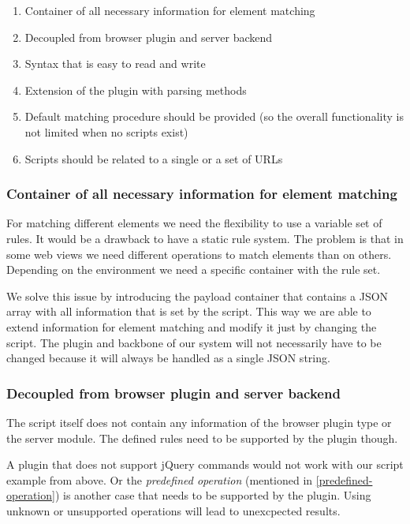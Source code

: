 \begin{enumerate}
	\item Container of all necessary information for element matching
	\item Decoupled from browser plugin and server backend
	\item Syntax that is easy to read and write
	\item Extension of the plugin with parsing methods
	\item Default matching procedure should be provided (so the overall functionality is not limited when no scripts exist)
	\item Scripts should be related to a single or a set of URLs
\end{enumerate}

\subsubsection{Container of all necessary information for element matching}

For matching different elements we need the flexibility to use a variable set of rules. It would be a drawback to have a static rule system. The problem is that in some web views we need different operations to match elements than on others. Depending on the environment we need a specific container with the rule set. 

We solve this issue by introducing the payload container that contains a JSON array with all information that is set by the script. This way we are able to extend information for element matching and modify it just by changing the script. The plugin and backbone of our system will not necessarily have to be changed because it will always be handled as a single JSON string.

\subsubsection{Decoupled from browser plugin and server backend}\label{decoupled-req}

The script itself does not contain any information of the browser plugin type or the server module. The defined rules need to be supported by the plugin though. 

A plugin that does not support jQuery commands would not work with our script example from above. Or the \emph{predefined operation} (mentioned in \ref{predefined-operation}) is another case that needs to be supported by the plugin. Using unknown or unsupported operations will lead to unexcpected results.  


